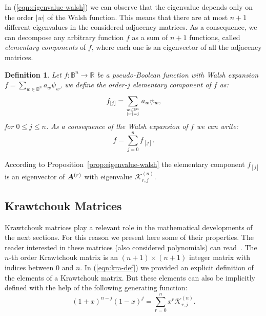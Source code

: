 \documentclass{article}
\newtheorem{definition}{Definition}
\def\vec#1{\mathchoice{\mbox{\boldmath$\displaystyle#1$}}
  {\mbox{\boldmath$\textstyle#1$}}
  {\mbox{\boldmath$\scriptstyle#1$}}
  {\mbox{\boldmath$\scriptscriptstyle#1$}}}
\newcommand{\Bo}[0]{\mathbb{B}}
\newcommand{\Real}[0]{\mathbb{R}}
\newcommand{\krawel}[3]{\mathcal{K}^{#1}_{#2,#3}}
\begin{document}
In (\ref{eqn:eigenvalue-walsh}) we can observe that the eigenvalue depends only on the order $|w|$ of the Walsh function. This means that there are at most $n+1$ different eigenvalues in the considered adjacency matrices. As a consequence, we can decompose any arbitrary function $f$ as a sum of $n+1$ functions, called \emph{elementary components} of $f$, where each one is an eigenvector of all the adjacency matrices. 

\begin{definition}
Let $f:\Bo^n \rightarrow \Real$ be a pseudo-Boolean function with Walsh expansion $f= \sum_{w \in \Bo^n} a_w \psi_w$, we define the order-$j$ elementary component of $f$ as:
\begin{equation}
f_{[j]} = \sum_{w \in \Bo^n \atop |w|=j} a_w \psi_w,
\end{equation}
for $0\leq j \leq n$. As a consequence of the Walsh expansion of $f$ we can write:
\begin{equation}
f = \sum_{j=0}^{n} f_{[j]} .
\end{equation}
\end{definition}

According to Proposition~\ref{prop:eigenvalue-walsh} the elementary component $f_{[j]}$ is an eigenvector of $\vec{A}^{(r)}$ with eigenvalue $\krawel{(n)}{r}{j}$.

\subsection{Krawtchouk Matrices}

Krawtchouk matrices play a relevant role in the mathematical developments of the next sections. For this reason we present here some of their properties. The reader interested in these matrices (also considered polynomials) can read~\cite{Feinsilver2005}. The $n$-th order Krawtchouk matrix is an $(n+1)\times(n+1)$ integer matrix with indices between $0$ and $n$. In (\ref{eqn:kra-def}) we provided an explicit definition of the elements of a Krawtchouk matrix. But these elements can also be implicitly defined with the help of the following generating function:
\begin{equation}
\label{eqn:kr-generating}
(1+x)^{n-j}(1-x)^{j} = \sum_{r=0}^n x^r \krawel{(n)}{r}{j}.
\end{equation}
\end{document}
